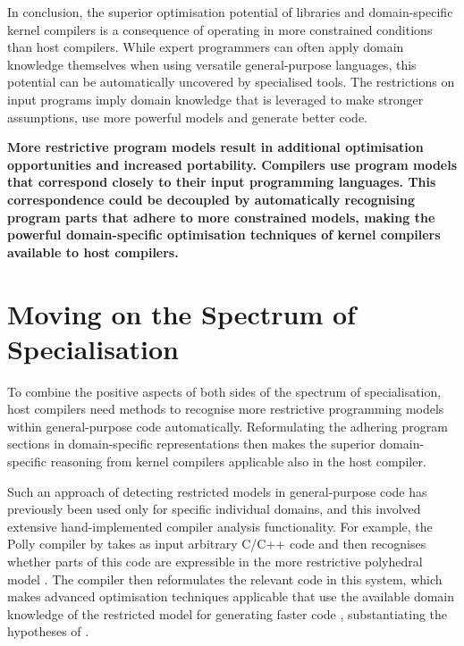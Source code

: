     In conclusion, the superior optimisation potential of libraries and
    domain-specific kernel compilers is a consequence of operating in more
    constrained conditions than host compilers.
    While expert programmers can often apply domain knowledge themselves
    when using versatile general-purpose languages, this potential can be
    automatically uncovered by specialised tools.
    The restrictions on input programs imply domain knowledge that is leveraged
    to make stronger assumptions, use more powerful models and generate better
    code.

    {\bf
    More restrictive program models result in additional optimisation
    opportunities and increased portability.
    Compilers use program models that correspond closely to their input
    programming languages.
    This correspondence could be decoupled by automatically recognising program
    parts that adhere to more constrained models, making the powerful
    domain-specific optimisation techniques of kernel compilers available to
    host compilers.
    }

\section{Moving on the Spectrum of Specialisation}

    To combine the positive aspects of both sides of the spectrum of
    specialisation, host compilers need methods to recognise more restrictive
    programming models within general-purpose code automatically.
    Reformulating the adhering program sections in domain-specific
    representations then makes the superior domain-specific reasoning from
    kernel compilers applicable also in the host compiler.

    Such an approach of detecting restricted models in general-purpose code has
    previously been used only for specific individual domains, and this involved
    extensive hand-implemented compiler analysis functionality.
    For example, the Polly compiler by \citet{Lengauer2012Polly} takes as
    input arbitrary C/C++ code and then recognises whether parts of this code
    are expressible in the more restrictive polyhedral model
    \citep{Karp:1967:OCU:321406.321418,benabderrahmane2010polyhedral}.
    The compiler then reformulates the relevant code in this system, which
    makes advanced optimisation techniques applicable that use the available
    domain knowledge of the restricted model for generating faster code
    \citep{Moll:2016:ISS:2892208.2892217,Doerfert2015Polly}, substantiating the
    hypotheses of .

